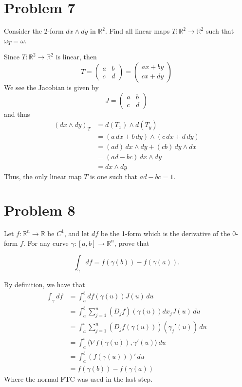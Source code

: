 \documentclass[11pt]{article}
\newcommand{\bbR}{\mathbb{R}}
\begin{document}
\section*{Problem 7}

Consider the 2-form $dx \wedge dy$ in $\mathbb{R}^2$. Find all linear maps $T : \mathbb{R}^2 \to \mathbb{R}^2$ such that $\omega_T = \omega$.
\begin{solution}
    Since $T: \bbR^2 \to \bbR^2$ is linear, then 
    \[T= \begin{pmatrix}
        a & b\\ c & d
    \end{pmatrix} = \begin{pmatrix}
        ax + by\\
        cx + dy
    \end{pmatrix}\] We see the Jacobian is given by 
    \[J = \begin{pmatrix}
        a & b\\
        c & d
    \end{pmatrix}\] and thus
    \begin{align*}
    (dx\wedge dy)_T &= d(T_x) \wedge d(T_y)\\&= (a\,dx + b\,dy)\wedge (c\,dx + d\,dy)\\
    &= (ad)\,dx\wedge dy + (cb)\,dy \wedge dx\\
    &= (ad -bc)\,dx\wedge dy\\
    &= dx\wedge dy
    \end{align*}
    Thus, the only linear map $T$ is one such that $ad - bc  =1.$
\end{solution}

\newpage

\section*{Problem 8}

Let $f : \mathbb{R}^n \to \mathbb{R}$ be $C^1$, and let $df$ be the 1-form which is the derivative of the 0-form $f$. For any curve $\gamma : [a, b] \to \mathbb{R}^n$, prove that

\[
\int_{\gamma} df = f(\gamma(b)) - f(\gamma(a)).
\]
\begin{solution}
    By definition, we have that 
    \begin{align*}
        \int_\gamma df &= \int_a^b df(\gamma(u))J(u)\,du\\
        &= \int_a^b \sum_{j=1}^n (D_jf)(\gamma(u))dx_j J(u)\,du\\
        &= \int_a^b \sum_{j=1}^n (D_jf(\gamma(u)))(\gamma_j'(u))\,du\\
        &= \int_a^b \langle\nabla f(\gamma(u)), \gamma'(u)\rangle\,du\\
        &= \int_a^b (f(\gamma(u)))'\,du\\
        &= f(\gamma(b)) - f(\gamma(a))
    \end{align*}
    Where the normal FTC was used in the last step.
\end{solution}
\end{document}
